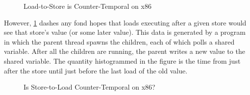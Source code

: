 {\begin{figure}
\centering
{}
\caption{Load-to-Store is Counter-Temporal on x86}
\label{fig:memorder:Load-to-Store is Counter-Temporal on x86}
\end{figure}

	However,
	\cref{fig:memorder:Load-to-Store is Counter-Temporal on x86}
	dashes any fond hopes that loads executing after a given store
	would see that store's value (or some later value).
	This data is generated by a program in which the parent thread
	spawns the children, each of which polls a shared variable.
	After all the children are running, the parent writes a new
	value to the shared variable.
	The quantity histogrammed in the figure is the time from just
	after the store until just before the last load of the old value.

\begin{figure}
\centering
{}
\caption{Is Store-to-Load Counter-Temporal on x86?}
\label{fig:memorder:Is Store-to-Load Counter-Temporal on x86?}
\end{figure}

}
